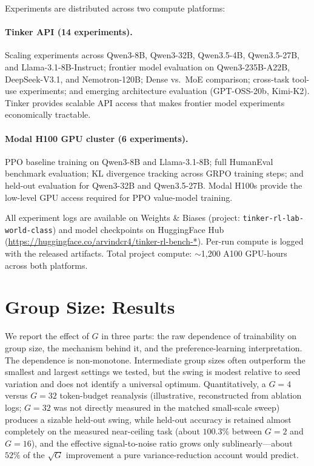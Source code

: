 \documentclass{article}
\begin{document}
Experiments are distributed across two compute platforms:

\paragraph{Tinker API (14 experiments).}
Scaling experiments across Qwen3-8B, Qwen3-32B, Qwen3.5-4B, Qwen3.5-27B,
and Llama-3.1-8B-Instruct; frontier model evaluation on Qwen3-235B-A22B,
DeepSeek-V3.1, and Nemotron-120B; Dense vs.~MoE comparison; cross-task
tool-use experiments; and emerging architecture evaluation (GPT-OSS-20b,
Kimi-K2). Tinker provides scalable API access that makes frontier model
experiments economically tractable.

\paragraph{Modal H100 GPU cluster (6 experiments).}
PPO baseline training on Qwen3-8B and Llama-3.1-8B; full HumanEval
benchmark evaluation; KL divergence tracking across GRPO training steps;
and held-out evaluation for Qwen3-32B and Qwen3.5-27B. Modal H100s
provide the low-level GPU access required for PPO value-model training.

All experiment logs are available on Weights \& Biases (project:
\texttt{tinker-rl-lab-world-class}) and model checkpoints on HuggingFace
Hub (\url{https://huggingface.co/arvindcr4/tinker-rl-bench-*}).
Per-run compute is logged with the released artifacts. Total project compute:
$\sim$1,200 A100 GPU-hours across both platforms.

 \section{Group Size: Results}
\label{sec:p3-results}
We report the effect of $G$ in three parts: the raw dependence of trainability on
group size, the mechanism behind it, and the preference-learning interpretation.
The dependence is non-monotone. Intermediate group sizes often outperform the
smallest and largest settings we tested, but the swing is modest relative to
seed variation and does not identify a universal optimum. Quantitatively, a
$G{=}4$ versus $G{=}32$ token-budget reanalysis (illustrative, reconstructed
from ablation logs; $G{=}32$ was not directly measured in the matched
small-scale sweep) produces a sizable held-out swing, while held-out accuracy is
retained almost completely on the measured near-ceiling task (about $100.3\%$
between $G{=}2$ and $G{=}16$), and the effective signal-to-noise ratio grows only sublinearly---about
$52\%$ of the $\sqrt{G}$ improvement a pure variance-reduction account would
predict.
\end{document}
